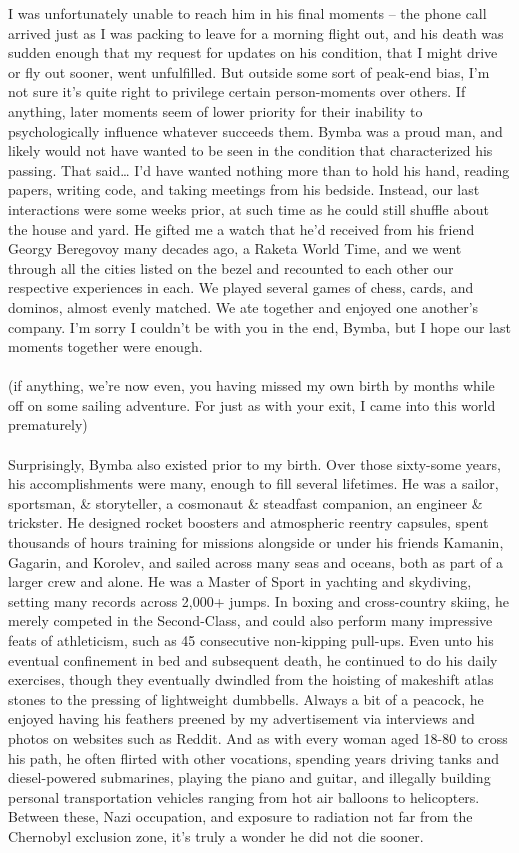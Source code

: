 \documentclass[twoside,twocolumn,openright]{article}
\begin{document}
I was unfortunately unable to reach him in his final moments – the phone call arrived just as I was packing to leave for a morning flight out, and his death was sudden enough that my request for updates on his condition, that I might drive or fly out sooner, went unfulfilled. But outside some sort of peak-end bias, I’m not sure it’s quite right to privilege certain person-moments over others. If anything, later moments seem of lower priority for their inability to psychologically influence whatever succeeds them. Bymba was a proud man, and likely would not have wanted to be seen in the condition that characterized his passing. That said… I’d have wanted nothing more than to hold his hand, reading papers, writing code, and taking meetings from his bedside. Instead, our last interactions were some weeks prior, at such time as he could still shuffle about the house and yard. He gifted me a watch that he’d received from his friend Georgy Beregovoy many decades ago, a Raketa World Time, and we went through all the cities listed on the bezel and recounted to each other our respective experiences in each. We played several games of chess, cards, and dominos, almost evenly matched. We ate together and enjoyed one another’s company. I’m sorry I couldn’t be with you in the end, Bymba, but I hope our last moments together were enough.
\\\\
(if anything, we’re now even, you having missed my own birth by months while off on some sailing adventure. For just as with your exit, I came into this world prematurely)
\\\\
Surprisingly, Bymba also existed prior to my birth. Over those sixty-some years, his accomplishments were many, enough to fill several lifetimes. He was a sailor, sportsman, \& storyteller, a cosmonaut \& steadfast companion, an engineer \& trickster. He designed rocket boosters and atmospheric reentry capsules, spent thousands of hours training for missions alongside or under his friends Kamanin, Gagarin, and Korolev, and sailed across many seas and oceans, both as part of a larger crew and alone. He was a Master of Sport in yachting and skydiving, setting many records across 2,000+ jumps. In boxing and cross-country skiing, he merely competed in the Second-Class, and could also perform many impressive feats of athleticism, such as 45 consecutive non-kipping pull-ups. Even unto his eventual confinement in bed and subsequent death, he continued to do his daily exercises, though they eventually dwindled from the hoisting of makeshift atlas stones to the pressing of lightweight dumbbells. Always a bit of a peacock, he enjoyed having his feathers preened by my advertisement via interviews and photos on websites such as Reddit. And as with every woman aged 18-80 to cross his path, he often flirted with other vocations, spending years driving tanks and diesel-powered submarines, playing the piano and guitar, and illegally building personal transportation vehicles ranging from hot air balloons to helicopters. Between these, Nazi occupation, and exposure to radiation not far from the Chernobyl exclusion zone, it’s truly a wonder he did not die sooner.
\end{document}
